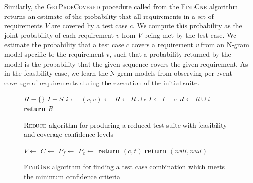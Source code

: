 Similarly, the \textsc{GetProbCovered} procedure called from the \textsc{FindOne} algorithm returns an
estimate of the probability that all requirements in a set of requirements $V$ are covered by a test case
$c$. We compute this probability as the joint probability of each requirement $v$ from $V$ being met
by the test case. We estimate the probability that a test case $c$ covers a requirement $v$ from an N-gram
model specific to the requirement $v$, such that a probability returned by the model is the probability that the
given sequence covers the given requirement. As in the feasibility case, we learn the N-gram models from
observing per-event coverage of requirements during the execution of the initial suite.

\begin{figure}
\begin{algorithmic}[1]
\State $R = \{\}$
\State $I = S$
\State $i \gets $ 
\State $(c,s) \gets$ 
\State $R \gets R \cup c$
\State $I \gets I - s$
\Else
\State $R \gets R \cup i$
\EndIf
\EndWhile
\State \textbf{return} $R$
\EndProcedure
\end{algorithmic}
\caption{\textsc{Reduce} algorithm for producing a reduced test suite with feasibility and coverage confidence levels}
\label{a:reduce}
\end{figure}

\begin{figure}
\begin{algorithmic}[1]
\State $V \gets $ 
\State $C \gets$ 
\State $P_f \gets$ 
\State $P_c \gets$ 
\State \textbf{return} $(c, t)$
\EndIf
\EndFor
\EndFor
\State \textbf{return} $(null, null)$
\EndProcedure
\end{algorithmic}
\caption{\textsc{FindOne} algorithm for finding a test case combination which meets the minimum confidence criteria}
\label{a:findone}
\end{figure}